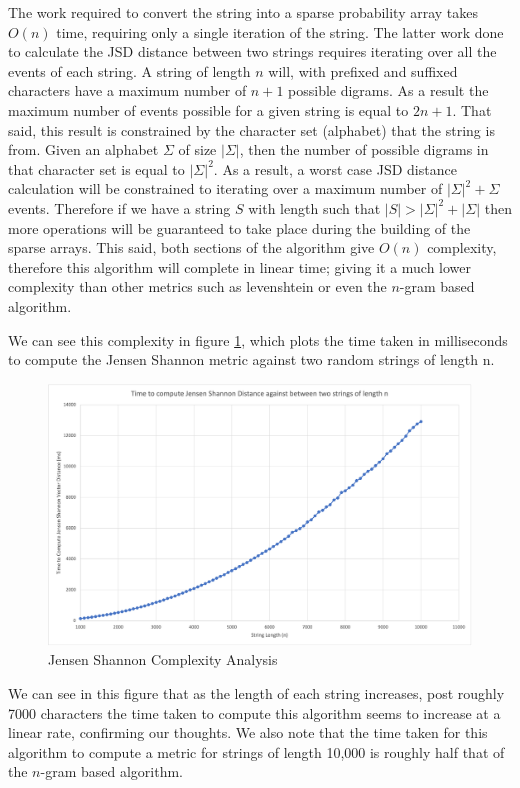 \documentclass[a4paper,11pt]{article}
\begin{document}
The work required to convert the string into a sparse probability array takes $O(n)$ time, requiring only a single iteration of the string. The latter work done to calculate the JSD distance between two strings requires iterating over all the events of each string. A string of length $n$ will, with prefixed and suffixed characters have a maximum number of $n+1$ possible digrams. As a result the maximum number of events possible for a given string is equal to $2n+1$. That said, this result is constrained by the character set (alphabet) that the string is from. Given an alphabet $\Sigma$ of size $|\Sigma|$, then the number of possible digrams in that character set is equal to $|\Sigma|^2$. As a result, a worst case JSD distance calculation will be constrained to iterating over a maximum number of $|\Sigma|^2 + \Sigma$ events. Therefore if we have a string $S$ with length such that $|S| > |\Sigma|^2 + |\Sigma|$ then more operations will be guaranteed to take place during the building of the sparse arrays. This said, both sections of the algorithm give $O(n)$ complexity, therefore this algorithm will complete in linear time; giving it a much lower complexity than other metrics such as levenshtein or even the $n$-gram based algorithm.

We can see this complexity in figure \ref{fig:jensenShannonGraph}, which plots the time taken in milliseconds to compute the Jensen Shannon metric against two random strings of length n.

\begin{figure}
    \centering
    \includegraphics[width=0.8\linewidth]{diagrams/JensenShannonComplexity.png}
    \caption{Jensen Shannon Complexity Analysis}
    \label{fig:jensenShannonGraph}
\end{figure}

We can see in this figure that as the length of each string increases, post roughly 7000 characters the time taken to compute this algorithm seems to increase at a linear rate, confirming our thoughts. We also note that the time taken for this algorithm to compute a metric for strings of length 10,000 is roughly half that of the $n$-gram based algorithm.
\end{document}
